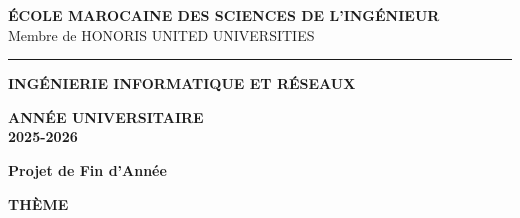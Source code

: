 \documentclass[12pt,a4paper]{report}
\begin{document}

\begin{titlepage}
    \thispagestyle{empty}
    \begin{center}

        \begin{minipage}{0.45\textwidth}
            \raggedright
        \end{minipage}
        \hfill
        \begin{minipage}{0.45\textwidth}
            \raggedleft
            \textbf{ÉCOLE MAROCAINE DES SCIENCES DE L'INGÉNIEUR}\\
            \small Membre de HONORIS UNITED UNIVERSITIES
        \end{minipage}

        \vspace{1cm}

        \rule{\textwidth}{1pt}

        \vspace{0.5cm}

        {\Large \textbf{INGÉNIERIE INFORMATIQUE ET RÉSEAUX}}\\

        \vspace{0.3cm}

        \textbf{ANNÉE UNIVERSITAIRE}\\
        \textbf{2025-2026}

        \vspace{1.5cm}

        {\huge \textbf{Projet de Fin d'Année}}

        \vspace{1cm}

        \textbf{\Large THÈME}

        \vspace{0.3cm}



\end{center}
\end{titlepage}
\end{document}
